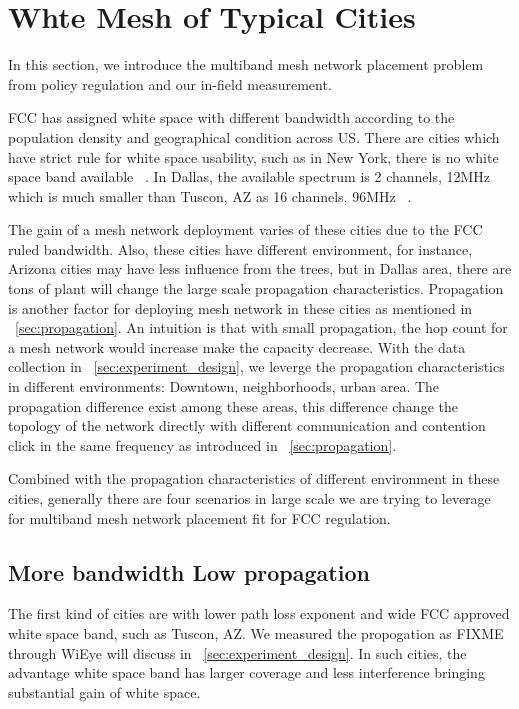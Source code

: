 \section{Whte Mesh of Typical Cities}
\label{sec:cities}

In this section, we introduce the multiband mesh network placement problem from policy regulation and our in-field measurement. 

FCC has assigned white space with different bandwidth according to the population density and geographical condition across US.
There are cities which have strict rule for white space usability, such as in New York, there is no white space band available ~\cite{googlespectrumdatabase}. 
In Dallas, the available spectrum is 2 channels, 12MHz which is much smaller than Tuscon, AZ as 16 channels, 96MHz ~\cite{googlespectrumdatabase}. 

The gain of a mesh network deployment varies of these cities due to the FCC ruled bandwidth.
Also, these cities have different environment, for instance, Arizona cities may have less influence from the trees, but in Dallas area, there are tons of plant will change the large scale propagation characteristics.
Propagation is another factor for deploying mesh network in these cities as mentioned in ~\ref{sec:propagation}.
An intuition is that with small propagation, the hop count for a mesh network would increase make the capacity decrease.
With the data collection in ~\ref{sec:experiment_design}, we leverge the propagation characteristics in different environments: Downtown, neighborhoods, urban area.
The propagation difference exist among these areas, this difference change the topology of the network directly with different communication and contention click in the same frequency as introduced in ~\ref{sec:propagation}.

Combined with the propagation characteristics of different environment in these cities, generally there are four scenarios in large scale we are trying to leverage for multiband mesh network placement fit for FCC regulation.


\subsection{More bandwidth Low propagation}
The first kind of cities are with lower path loss exponent and wide FCC approved white space band, such as Tuscon, AZ. We measured the propogation as FIXME through WiEye will discuss in ~\ref{sec:experiment_design}.
In such cities, the advantage white space band has larger coverage and less interference bringing substantial gain of white space.


